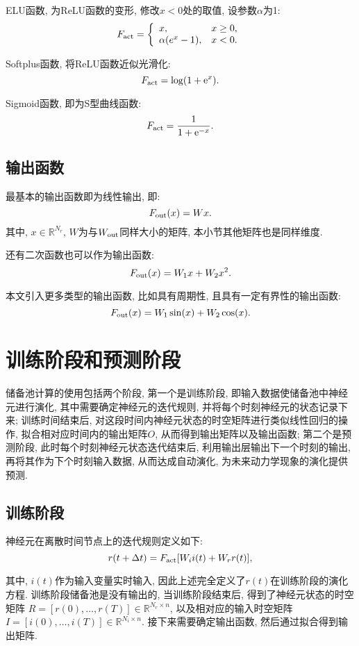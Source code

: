 \documentclass[notitlepage,cs4size,punct,oneside]{ctexrep}
\numberwithin{equation}{chapter}
\theoremstyle{mystyle}
\begin{document}
ELU函数, 为ReLU函数的变形, 修改$x<0$处的取值, 设参数$\alpha$为1:
$$
    F_{\textmd{act}} = \left\{\begin{array}{ll}
    x, & x\geq0,\\
    \alpha(e^x-1), & x<0.
    \end{array}\right.
$$

Softplus函数, 将ReLU函数近似光滑化:
$$
    F_{\textmd{act}} = \log(1+\textmd{e}^x).
$$

Sigmoid函数, 即为S型曲线函数:
$$
    F_{\textmd{act}} = \frac{1}{1+\textmd{e}^{-x}}.
$$


\subsection{输出函数}
最基本的输出函数即为线性输出, 即:
$$
    F_{\textmd{out}}(x) = Wx.
$$
其中, $x\in\mathbb{R}^{N_r}$, 
$W$为与$W_{\textmd{out}}$同样大小的矩阵, 本小节其他矩阵也是同样维度. 

还有二次函数也可以作为输出函数:
$$
    F_{\textmd{out}}(x) = W_1x + W_2x^2.
$$

本文引入更多类型的输出函数, 比如具有周期性, 且具有一定有界性的输出函数:
$$
    F_{\textmd{out}}(x) = W_1\sin(x) + W_2\cos(x).
$$


\section{训练阶段和预测阶段}
储备池计算的使用包括两个阶段, 第一个是训练阶段, 即输入数据使储备池中神经元进行演化, 
其中需要确定神经元的迭代规则, 并将每个时刻神经元的状态记录下来; 训练时间结束后, 
对这段时间内神经元状态的时空矩阵进行类似线性回归的操作, 拟合相对应时间内的输出矩阵$O$, 
从而得到输出矩阵以及输出函数; 第二个是预测阶段, 此时每个时刻神经元状态迭代结束后, 
利用输出层输出下一个时刻的输出, 再将其作为下个时刻输入数据, 从而达成自动演化, 
为未来动力学现象的演化提供预测. 

\subsection{训练阶段}
神经元在离散时间节点上的迭代规则定义如下:
$$
    r(t+\Delta t) = F_{\textmd{act}}[W_ii(t)+W_rr(t)],
$$

其中, $i(t)$作为输入变量实时输入, 因此上述完全定义了$r(t)$在训练阶段的演化方程. 
训练阶段储备池是没有输出的, 当训练阶段结束后, 得到了神经元状态的时空矩阵
$R=[r(0), \dots, r(T)]\in\mathbb{R}^{{N_r}\times{n}}$, 以及相对应的输入时空矩阵
$I=[i(0), \dots, i(T)]\in\mathbb{R}^{{N_i}\times{n}}$. 接下来需要确定输出函数, 然后通过拟合得到输出矩阵. 
\end{document}
